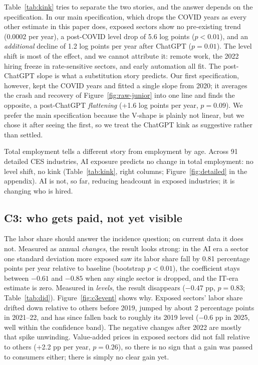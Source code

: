 Table~\ref{tab:kink} tries to separate the two stories, and the answer depends on the specification. In our main specification, which drops the COVID years as every other estimate in this paper does, exposed sectors show no pre-existing trend (0.0002 per year), a post-COVID level drop of 5.6 log points ($p<0.01$), and an \emph{additional} decline of 1.2 log points per year after ChatGPT ($p=0.01$). The level shift is most of the effect, and we cannot attribute it: remote work, the 2022 hiring freeze in rate-sensitive sectors, and early automation all fit. The post-ChatGPT slope is what a substitution story predicts. Our first specification, however, kept the COVID years and fitted a single slope from 2020; it averages the crash and recovery of Figure~\ref{fig:raw-junior} into one line and finds the opposite, a post-ChatGPT \emph{flattening} (+1.6 log points per year, $p=0.09$). We prefer the main specification because the V-shape is plainly not linear, but we chose it after seeing the first, so we treat the ChatGPT kink as suggestive rather than settled.

Total employment tells a different story from employment by age. Across 91 detailed CES industries, AI exposure predicts no change in total employment: no level shift, no kink (Table~\ref{tab:kink}, right columns; Figure~\ref{fig:detailed} in the appendix). AI is not, so far, reducing headcount in exposed industries; it is changing who is hired.

\subsection{C3: who gets paid, not yet visible}

The labor share should answer the incidence question; on current data it does not. Measured as annual \emph{changes}, the result looks strong: in the AI era a sector one standard deviation more exposed saw its labor share fall by 0.81 percentage points per year relative to baseline (bootstrap $p<0.01$), the coefficient stays between $-0.61$ and $-0.85$ when any single sector is dropped, and the IT-era estimate is zero. Measured in \emph{levels}, the result disappears ($-0.47$ pp, $p=0.83$; Table~\ref{tab:did}). Figure~\ref{fig:c3event} shows why. Exposed sectors' labor share drifted down relative to others before 2019, jumped by about 2 percentage points in 2021--22, and has since fallen back to roughly its 2019 level ($-0.6$ pp in 2025, well within the confidence band). The negative changes after 2022 are mostly that spike unwinding. Value-added prices in exposed sectors did not fall relative to others (+2.2 pp per year, $p=0.26$), so there is no sign that a gain was passed to consumers either; there is simply no clear gain yet.

